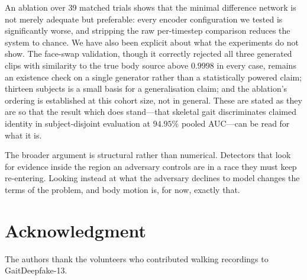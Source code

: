 \documentclass[journal]{IEEEtran}
\begin{document}
An ablation over 39 matched trials shows that the minimal difference network
is not merely adequate but preferable: every encoder configuration we tested is
significantly worse, and stripping the raw per-timestep comparison reduces the
system to chance. We have also been explicit about what the experiments do not
show. The face-swap validation, though it correctly rejected all three
generated clips with similarity to the true body source above $0.9998$ in every
case, remains an existence check on a single generator rather than a
statistically powered claim; thirteen subjects is a small basis for a
generalisation claim; and the ablation's ordering is established at this cohort
size, not in general. These are stated as they are so that the result which
does stand---that skeletal gait discriminates claimed identity in
subject-disjoint evaluation at $94.95\%$ pooled AUC---can be read for what it
is.

The broader argument is structural rather than numerical. Detectors that look
for evidence inside the region an adversary controls are in a race they must
keep re-entering. Looking instead at what the adversary declines to model
changes the terms of the problem, and body motion is, for now, exactly that.

\section*{Acknowledgment}

The authors thank the volunteers who contributed walking recordings to
GaitDeepfake-13.



\end{document}
